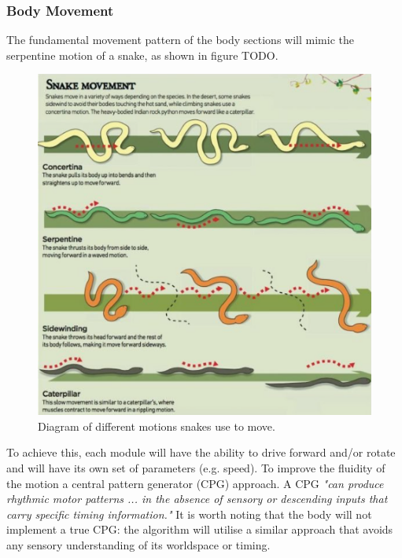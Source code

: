 \documentclass{article}
\begin{document}
\subsubsection{Body Movement}
The fundamental movement pattern of the body sections will mimic the serpentine motion of a snake, as shown in figure TODO.
\begin{figure}[H]
\centering
\includegraphics[scale=0.8]{snakeMovement}
\caption{Diagram of different motions snakes use to move. \citep{snakeMovement} }
\end{figure}
To achieve this, each module will have the ability to drive forward and/or rotate and will have its own set of parameters (e.g. speed). To improve the fluidity of the motion a central pattern generator (CPG) approach. A CPG \textit{"can produce rhythmic motor patterns ... in the absence of sensory or descending inputs that carry specific timing information."}  It is worth noting that the body will not implement a true CPG: the algorithm will utilise a similar approach that avoids any sensory understanding of its worldspace or timing.\\
\end{document}
